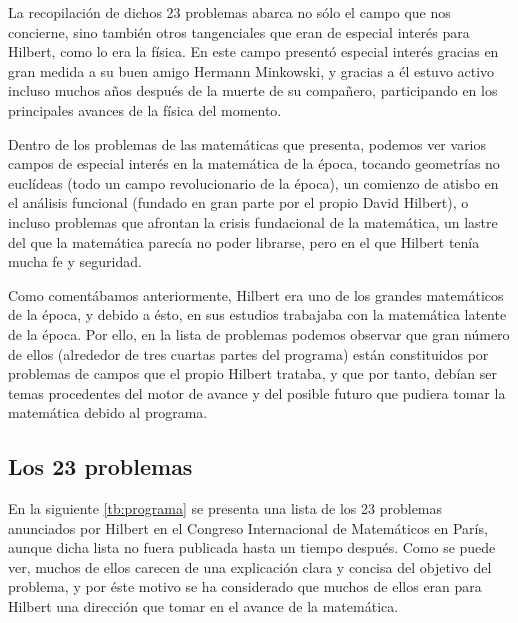 La recopilación de dichos 23 problemas abarca no sólo el campo que nos concierne, sino también otros tangenciales que eran de especial 
interés para Hilbert, como lo era la física. En este campo presentó especial interés gracias en gran medida a su buen amigo Hermann Minkowski,
y gracias a él estuvo activo incluso muchos años después de la muerte de su compañero, participando en los principales avances de la física del momento.

Dentro de los problemas de las matemáticas que presenta, podemos ver varios campos de especial interés en la matemática de la época, tocando geometrías no euclídeas
(todo un campo revolucionario de la época), un comienzo de atisbo en el análisis funcional (fundado en gran parte por el propio David Hilbert),
o incluso problemas que afrontan la crisis fundacional de la matemática, un lastre del que la matemática parecía no poder librarse, pero en el que Hilbert 
tenía mucha fe y seguridad.

Como comentábamos anteriormente, Hilbert era uno de los grandes matemáticos de la época, y debido a ésto, en sus estudios trabajaba con la 
matemática latente de la época. Por ello, en la lista de problemas podemos observar que gran número de ellos (alrededor de tres cuartas partes del
programa) están constituidos por problemas de campos que el propio Hilbert trataba, y que por tanto, debían ser temas procedentes del motor de avance
y del posible futuro que pudiera tomar la matemática debido al programa. 

  
\subsection{Los 23 problemas}

En la siguiente \autoref{tb:programa} se presenta una lista de los 23 problemas anunciados por Hilbert en el Congreso Internacional de Matemáticos en París,
aunque dicha lista no fuera publicada hasta un tiempo después. Como se puede ver, muchos de ellos carecen de una explicación clara y concisa del objetivo del problema,
y por éste motivo se ha considerado que muchos de ellos eran para Hilbert una dirección que tomar en el avance de la matemática.

